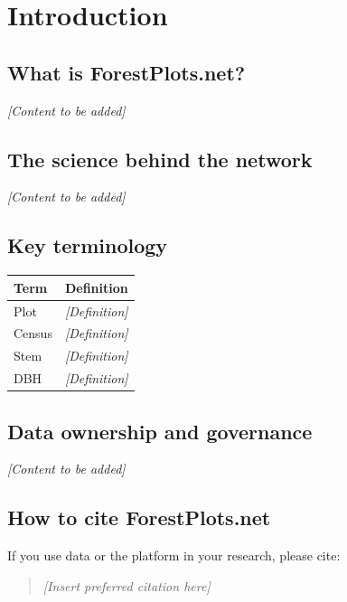 \documentclass[
]{book}
\newcounter{none} %
\begin{document}
\chapter{Introduction}\label{introduction}

\section{What is ForestPlots.net?}\label{what-is-forestplots.net}

\emph{{[}Content to be added{]}}

\section{The science behind the network}\label{the-science-behind-the-network}

\emph{{[}Content to be added{]}}

\section{Key terminology}\label{key-terminology}

{\def\LTcaptype{none} %
\begin{longtable}[]{@{}ll@{}}
\toprule\noalign{}
Term & Definition \\
\midrule\noalign{}
\endhead
\bottomrule\noalign{}
\endlastfoot
Plot & \emph{{[}Definition{]}} \\
Census & \emph{{[}Definition{]}} \\
Stem & \emph{{[}Definition{]}} \\
DBH & \emph{{[}Definition{]}} \\
\end{longtable}
}

\section{Data ownership and governance}\label{data-ownership-and-governance}

\emph{{[}Content to be added{]}}

\section{How to cite ForestPlots.net}\label{how-to-cite-forestplots.net}

If you use data or the platform in your research, please cite:

\begin{quote}
\emph{{[}Insert preferred citation here{]}}
\end{quote}
\end{document}
